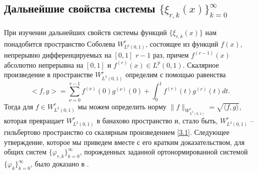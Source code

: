 \documentclass{article}
\numberwithin{equation}{section}
\theoremstyle{plain}
\theoremstyle{definition}
\begin{document}
\begin{fulltext}
\section{Дальнейшие свойства системы $\{\xi_{r,k}(x)\}_{k=0}^\infty$ }\label{s3}
При изучении дальнейших свойств системы функций $\{\xi_{r,k}(x)\}$ нам понадобится  пространство Соболева $W^r_{L^p(0,1)}$, состоящее из функций $f(x)$, непрерывно дифференцируемых на $[0,1]$ $r-1$ раз, причем $f^{(r-1)}(x)$ абсолютно непрерывна на $[0,1]$  и $f^{(r)}(x)\in L^p(0,1)$.
Скалярное произведение в пространстве $W^r_{L^2(0,1)}$ определим с помощью равенства
\begin{equation}\label{3.1}
<f,g>=\sum_{\nu=0}^{r-1}f^{(\nu)}(0)g^{(\nu)}(0)+\int_{0}^{1} f^{(r)}(t)g^{(r)}(t) dt.
\end{equation}
 Тогда для $f\in W^r_{L^2(0,1)}$ мы можем определить норму $\|f\|_{W^r_{L^2(0,1)}}=\sqrt{\langle f,g\rangle}$, которая превращает $W^r_{L^2(0,1)}$ в банахово пространство и, стало быть, $W^r_{L^2(0,1)}$ -- гильбертово пространство со скалярным произведением \eqref{3.1}. Следующее утверждение, которое мы приведем вместе с его кратким доказательством,  для общих систем $\{\varphi_{r,k}\}_{k=0}^\infty$, порожденных заданной ортонормированной системой $\{\varphi_{k}\}_{k=0}^\infty$, было доказано  в \cite{SharIzv2018}.


\end{fulltext}
\end{document}
